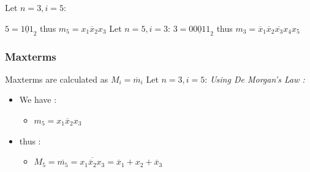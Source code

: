 \documentclass[12pt,openany]{book}
\begin{document}
			      	Let $ n = 3, i = 5$:\newline
			      	
			      	$ 5 = \underline{101}_2$
			      	thus $m_5 = x_1 \overline{x}_2 x_3$ \newline
			      	Let $n=5, i=3$:\newline
			      	$ 3 = \underline{00011}_2$
			      	thus $m_3 = \overline{x}_1 \overline{x}_2 \overline{x_3} x_4 {x}_5$ \newline
			      	
			      	\newpage
			      	\subsubsection{Maxterms}
			      	Maxterms are calculated as $M_i = \overline{m}_i$ \newline
			      	Let $ n = 3, i = 5$:
			      	\newline \textit{Using De Morgan's Law :}
			      	\begin{itemize}
			      		\item[]We have :
			      		      \begin{itemize}
			      		      	\item[] $m_5 = x_1 \overline{x}_2 x_3$
			      		      \end{itemize}
			      		\item[]thus :
			      		      \begin{itemize}
			      		      	\item[] $M_5 = \overline{m_5} =  \overline{x_1 \overline{x}_2 x_3} = \overline{x}_1 + x_2 + \overline{x}_3$ \newline
			      		      \end{itemize}
			      	\end{itemize}
			      	
\end{document}
